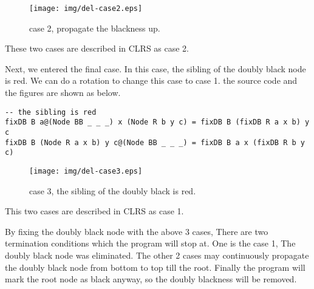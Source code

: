 \documentclass{article}
\begin{document}
\begin{figure}[htbp]
       \begin{center}
	\texttt{[image: img/del-case2.eps]}
        \caption{case 2, propagate the blackness up.} \label{fig:del-case2}
       \end{center}
\end{figure}

These two cases are described in CLRS as case 2.

Next, we entered the final case. In this case, the sibling of the doubly black node is red.
We can do a rotation to change this case to case 1. the source code and the figures are shown
as below.

\begin{lstlisting}
-- the sibling is red
fixDB B a@(Node BB _ _ _) x (Node R b y c) = fixDB B (fixDB R a x b) y c
fixDB B (Node R a x b) y c@(Node BB _ _ _) = fixDB B a x (fixDB R b y c)
\end{lstlisting}

\begin{figure}[htbp]
       \begin{center}
	\texttt{[image: img/del-case3.eps]}
        \caption{case 3, the sibling of the doubly black is red.} \label{fig:del-case3}
       \end{center}
\end{figure}

This two cases are described in CLRS as case 1.

By fixing the doubly black node with the above 3 cases, There are two termination conditions
which the program will stop at. One is the case 1, The doubly black node was eliminated. The
other 2 cases may continuously propagate the doubly black node from bottom to top till the root.
Finally the program will mark the root node as black anyway, so the doubly blackness will be
removed.
\end{document}
